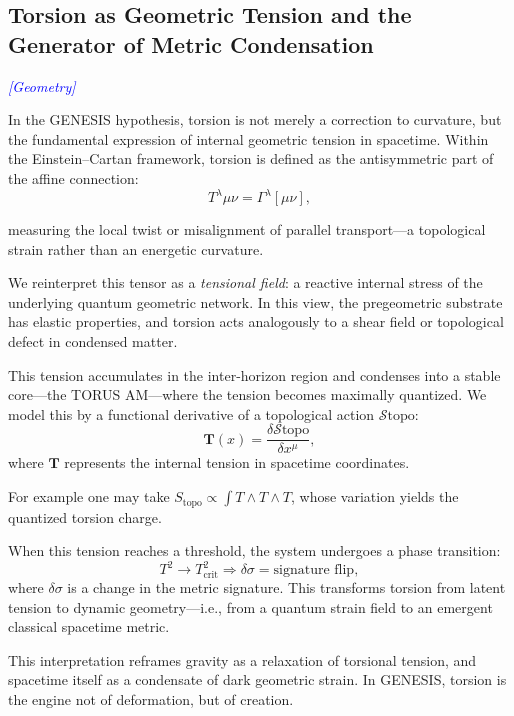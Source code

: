 \documentclass{article}
\newcommand{\geometrytag}{\textcolor{blue}{\textit{[Geometry]}}}
\begin{document}
\subsection{Torsion as Geometric Tension and the Generator of Metric Condensation} 
\geometrytag

In the GENESIS hypothesis, torsion is not merely a correction to curvature, but the fundamental expression of internal geometric tension in spacetime. Within the Einstein--Cartan framework, torsion is defined as the antisymmetric part of the affine connection:
\begin{equation} T^{\lambda}{}{\mu\nu} = \Gamma^{\lambda}{}{[\mu\nu]}, \end{equation} 

measuring the local twist or misalignment of parallel transport---a topological strain rather than an energetic curvature.

We reinterpret this tensor as a \textit{tensional field}: a reactive internal stress of the underlying quantum geometric network. In this view, the pregeometric substrate has elastic properties, and torsion acts analogously to a shear field or topological defect in condensed matter.

This tension accumulates in the inter-horizon region and condenses into a stable core---the TORUS AM---where the tension becomes maximally quantized. We model this by a functional derivative of a topological action $\mathcal{S}{\text{topo}}$: \begin{equation} \mathbf{T}(x) = \frac{\delta \mathcal{S}{\text{topo}}}{\delta x^\mu}, \end{equation} where $\mathbf{T}$ represents the internal tension in spacetime coordinates.

For example one may take
$S_{\text{topo}} \propto \int T \wedge T \wedge T$,
whose variation yields the quantized torsion charge.

When this tension reaches a threshold, the system undergoes a phase transition: \begin{equation} T^2 \rightarrow T_{\text{crit}}^2 \Rightarrow \delta \sigma = \text{signature flip}, \end{equation} where $\delta \sigma$ is a change in the metric signature. This transforms torsion from latent tension to dynamic geometry---i.e., from a quantum strain field to an emergent classical spacetime metric.

This interpretation reframes gravity as a relaxation of torsional tension, and spacetime itself as a condensate of dark geometric strain. In GENESIS, torsion is the engine not of deformation, but of creation.
\end{document}
